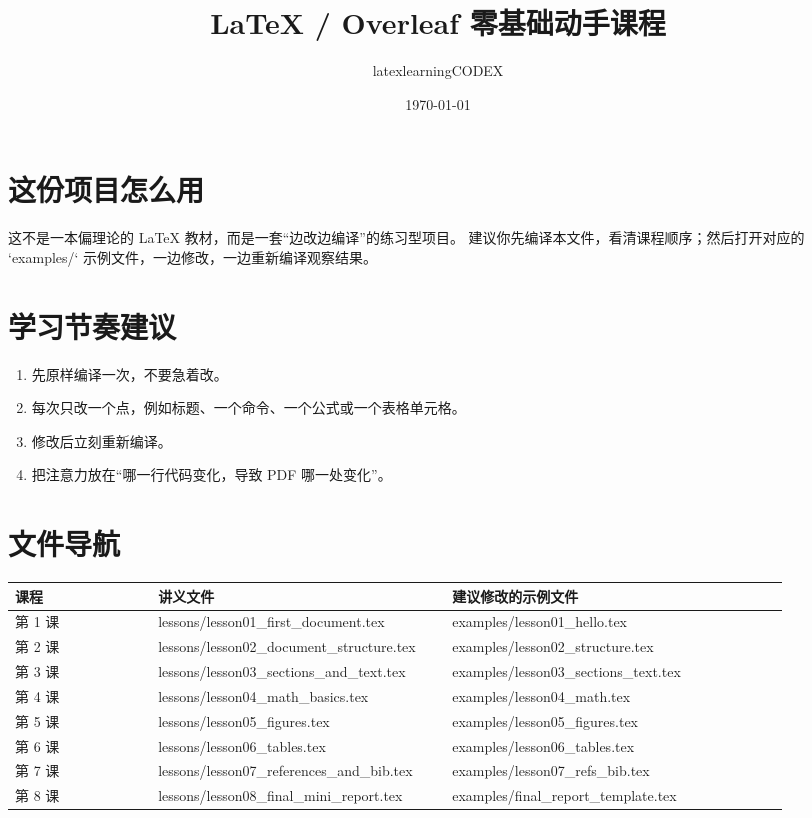 \documentclass[12pt,a4paper]{ctexart} %
\title{LaTeX / Overleaf 零基础动手课程}
\author{latexlearningCODEX}
\date{\today}
\begin{document}
\maketitle

\section*{这份项目怎么用}

这不是一本偏理论的 LaTeX 教材，而是一套“边改边编译”的练习型项目。
建议你先编译本文件，看清课程顺序；然后打开对应的 `examples/` 示例文件，一边修改，一边重新编译观察结果。

\section*{学习节奏建议}

\begin{enumerate}
  \item 先原样编译一次，不要急着改。
  \item 每次只改一个点，例如标题、一个命令、一个公式或一个表格单元格。
  \item 修改后立刻重新编译。
  \item 把注意力放在“哪一行代码变化，导致 PDF 哪一处变化”。
\end{enumerate}

\section*{文件导航}

\begin{longtable}{>{\raggedright\arraybackslash}p{0.17\linewidth} >{\raggedright\arraybackslash}p{0.33\linewidth} >{\raggedright\arraybackslash}p{0.40\linewidth}}
\textbf{课程} & \textbf{讲义文件} & \textbf{建议修改的示例文件} \\
\hline
第 1 课 & lessons/lesson01\_first\_document.tex & examples/lesson01\_hello.tex \\
第 2 课 & lessons/lesson02\_document\_structure.tex & examples/lesson02\_structure.tex \\
第 3 课 & lessons/lesson03\_sections\_and\_text.tex & examples/lesson03\_sections\_text.tex \\
第 4 课 & lessons/lesson04\_math\_basics.tex & examples/lesson04\_math.tex \\
第 5 课 & lessons/lesson05\_figures.tex & examples/lesson05\_figures.tex \\
第 6 课 & lessons/lesson06\_tables.tex & examples/lesson06\_tables.tex \\
第 7 课 & lessons/lesson07\_references\_and\_bib.tex & examples/lesson07\_refs\_bib.tex \\
第 8 课 & lessons/lesson08\_final\_mini\_report.tex & examples/final\_report\_template.tex \\
\end{longtable}
\end{document}
